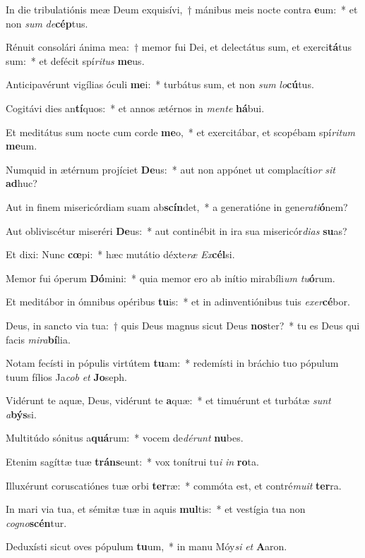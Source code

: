 \item In die tribulatiónis meæ Deum exquisívi,~† mánibus meis nocte contra \textbf{e}um:~* et non \textit{sum} \textit{de}\textbf{cép}tus.
\item Rénuit consolári ánima mea:~† memor fui Dei, et delectátus sum, et exerci\textbf{tá}tus sum:~* et defécit spí\textit{ri}\textit{tus} \textbf{me}us.
\item Anticipavérunt vigílias óculi \textbf{me}i:~* turbátus sum, et non \textit{sum} \textit{lo}\textbf{cú}tus.
\item Cogitávi dies an\textbf{tí}quos:~* et annos ætérnos in \textit{men}\textit{te} \textbf{há}bui.
\item Et meditátus sum nocte cum corde \textbf{me}o,~* et exercitábar, et scopébam spí\textit{ri}\textit{tum} \textbf{me}um.
\item Numquid in ætérnum projíciet \textbf{De}us:~* aut non appónet ut complacíti\textit{or} \textit{sit} \textbf{ad}huc?
\item Aut in finem misericórdiam suam ab\textbf{scín}det,~* a generatióne in gene\textit{ra}\textit{ti}\textbf{ó}nem?
\item Aut obliviscétur miseréri \textbf{De}us:~* aut continébit in ira sua misericór\textit{di}\textit{as} \textbf{su}as?
\item Et dixi: Nunc \textbf{cœ}pi:~* hæc mutátio déxte\textit{ræ} \textit{Ex}\textbf{cél}si.
\item Memor fui óperum \textbf{Dó}mini:~* quia memor ero ab inítio mirabíli\textit{um} \textit{tu}\textbf{ó}rum.
\item Et meditábor in ómnibus opéribus \textbf{tu}is:~* et in adinventiónibus tuis \textit{ex}\textit{er}\textbf{cé}bor.
\item Deus, in sancto via tua:~† quis Deus magnus sicut Deus \textbf{nos}ter?~* tu es Deus qui facis \textit{mi}\textit{ra}\textbf{bí}lia.
\item Notam fecísti in pópulis virtútem \textbf{tu}am:~* redemísti in bráchio tuo pópulum tuum fílios Ja\textit{cob} \textit{et} \textbf{Jo}seph.
\item Vidérunt te aquæ, Deus, vidérunt te \textbf{a}quæ:~* et timuérunt et turbátæ \textit{sunt} \textit{a}\textbf{býs}si.
\item Multitúdo sónitus a\textbf{quá}rum:~* vocem de\textit{dé}\textit{runt} \textbf{nu}bes.
\item Etenim sagíttæ tuæ \textbf{tráns}eunt:~* vox tonítrui tu\textit{i} \textit{in} \textbf{ro}ta.
\item Illuxérunt coruscatiónes tuæ orbi \textbf{ter}ræ:~* commóta est, et contré\textit{mu}\textit{it} \textbf{ter}ra.
\item In mari via tua, et sémitæ tuæ in aquis \textbf{mul}tis:~* et vestígia tua non \textit{co}\textit{gno}\textbf{scén}tur.
\item Deduxísti sicut oves pópulum \textbf{tu}um,~* in manu Móy\textit{si} \textit{et} \textbf{A}aron.

